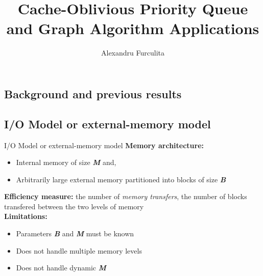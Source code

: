 \documentclass{beamer}
\title{Cache-Oblivious Priority Queue and Graph Algorithm Applications} %
\author{Alexandru Furculita}
\begin{document}
  \frame{\maketitle}


  \begin{darkframes}
    \section{Background and previous results}
    
    \subsection{I/O Model or external-memory model}
    \begin{frame}{I/O Model or external-memory model}
        \textbf{Memory architecture:}
        \begin{itemize}
            \item Internal memory of size \textit{\textbf{M}} and,
            \item Arbitrarily large external memory partitioned into blocks of size \textit{\textbf{B}}
        \end{itemize}
      	\bigskip
        \textbf{Efficiency measure:} the number of \textit{memory transfers}, the number of blocks transfered between the two levels of memory\\\bigskip
        \textbf{Limitations:}
        \begin{itemize}
            \item Parameters \textit{\textbf{B}} and \textit{\textbf{M}} must be known
            \item Does not handle multiple memory levels
            \item Does not handle dynamic \textbf{\textit{M}}
        \end{itemize}
    \end{frame}


\end{darkframes}
\end{document}
